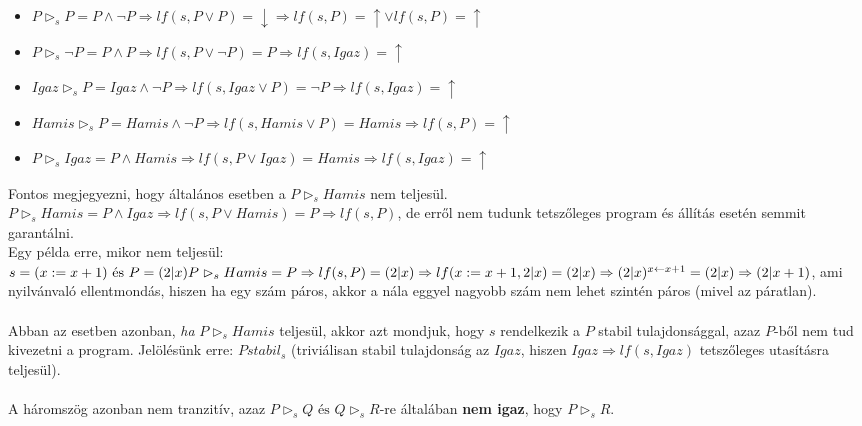 \documentclass[12pt]{article}
\begin{document}
\begin{itemize}
	\item $P \vartriangleright_s P = P \land \neg P \Rightarrow lf(s,P \lor P) = \downarrow \Rightarrow lf(s,P) = \uparrow \lor lf(s,P) = \uparrow$
	\item $P \vartriangleright_s \neg P = P \land P \Rightarrow lf(s,P \lor \neg P) = P \Rightarrow lf(s,Igaz) = \uparrow$
	\item $Igaz \vartriangleright_s P = Igaz \land \neg P \Rightarrow lf(s,Igaz \lor P) = \neg P \Rightarrow lf(s,Igaz) = \uparrow$
	\item $Hamis \vartriangleright_s P = Hamis \land \neg P \Rightarrow lf(s, Hamis \lor P) = Hamis \Rightarrow lf(s,P) = \uparrow$
	\item $P \vartriangleright_s Igaz = P \land Hamis \Rightarrow lf(s,P \lor Igaz) = Hamis \Rightarrow lf(s,Igaz) = \uparrow$
	
\end{itemize}
Fontos megjegyezni, hogy általános esetben a $P \vartriangleright_s Hamis$ nem teljesül.\\
$P \vartriangleright_s Hamis = P \land Igaz \Rightarrow lf(s,P \lor Hamis) = P \Rightarrow lf(s,P)$, de erről nem tudunk tetszőleges program és állítás esetén semmit garantálni.\\
Egy példa erre, mikor nem teljesül:\\
$s = (x := x+1) \text{ és } P = (2|x) \\
P \vartriangleright_s Hamis = P \Rightarrow lf(s,P) = (2|x) \Rightarrow lf(x:=x+1, 2|x) = (2|x) \Rightarrow (2|x)^{x \leftarrow x+1} = (2|x) \Rightarrow (2|x+1) $, ami nyilvánvaló ellentmondás, hiszen ha egy szám páros, akkor a nála eggyel nagyobb szám nem lehet szintén páros (mivel az páratlan).
\paragraph{}Abban az esetben azonban, \textit{ha} $P \vartriangleright_s Hamis$ teljesül, akkor azt mondjuk, hogy $s$ rendelkezik a $P$ stabil tulajdonsággal, azaz $P$-ből nem tud kivezetni a program. Jelölésünk erre: $P stabil_s$ (triviálisan stabil tulajdonság az $Igaz$, hiszen $Igaz \Rightarrow lf(s,Igaz)$ tetszőleges utasításra teljesül).

\paragraph{}A háromszög azonban nem tranzitív, azaz $ P \vartriangleright_s Q \text{ és } Q \vartriangleright_s R$-re általában \textbf{nem igaz}, hogy $P \vartriangleright_s R$.
\end{document}
